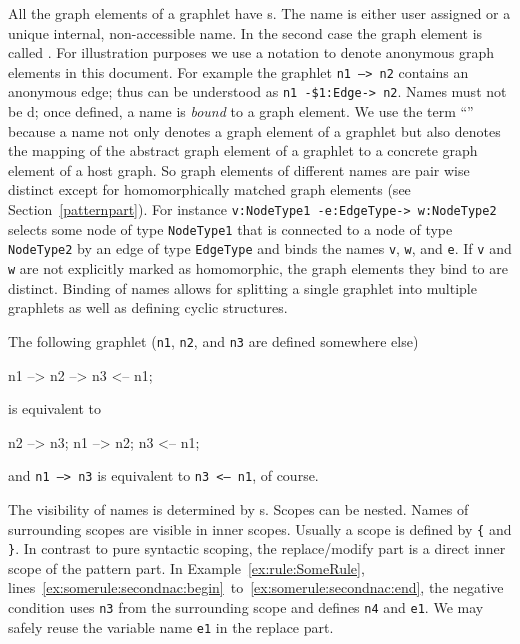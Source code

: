 All the graph elements of a graphlet have s.
The name is either user assigned or a unique internal, non-accessible name.
In the second case the graph element is called .
For illustration purposes we use a  notation to denote anonymous graph elements in this document.
For example the graphlet \texttt{n1 --> n2} contains an anonymous edge; thus can be understood as \texttt{n1 -\$1:Edge-> n2}.
Names must not be d; once defined, a name is \emph{bound} to a graph element. 
We use the term ``'' because a name not only denotes a graph element of a graphlet but also denotes the mapping of the abstract graph element of a graphlet to a concrete graph element of a host graph.
So graph elements of different names are pair wise distinct except for homomorphically matched graph elements (see Section~\ref{patternpart}).
For instance \texttt{v:NodeType1 -e:EdgeType-> w:NodeType2} selects some node of type \texttt{Node\-Type1} that is connected to a node of type \texttt{NodeType2} by an edge of type \texttt{EdgeType} and binds the names \texttt{v}, \texttt{w}, and \texttt{e}. 
If \texttt{v} and \texttt{w} are not explicitly marked as homomorphic, the graph elements they bind to are distinct.
Binding of names allows for splitting a single graphlet into multiple graphlets as well as defining cyclic structures.
\begin{example}
The following graphlet (\texttt{n1}, \texttt{n2}, and \texttt{n3} are defined somewhere else)
\begin{grgen}
n1 --> n2 --> n3 <-- n1;
\end{grgen}
is equivalent to
\begin{grgen}
n2 --> n3;
n1 --> n2;
n3 <-- n1;
\end{grgen}
and \texttt{n1 --> n3} is equivalent to \texttt{n3 <-- n1}, of course.
\end{example}
The visibility of names is determined by s. 
Scopes can be nested. 
Names of surrounding scopes are visible in inner scopes. 
Usually a scope is defined by \texttt{\{} and \texttt{\}}.
In contrast to pure syntactic scoping, the replace/modify part is a direct inner scope of the pattern part.
In Example~\ref{ex:rule:SomeRule}, lines~\ref{ex:somerule:secondnac:begin}~to~\ref{ex:somerule:secondnac:end}, the negative condition uses \texttt{n3} from the surrounding scope and defines \texttt{n4} and \texttt{e1}. 
We may safely reuse the variable name \texttt{e1} in the replace part.

